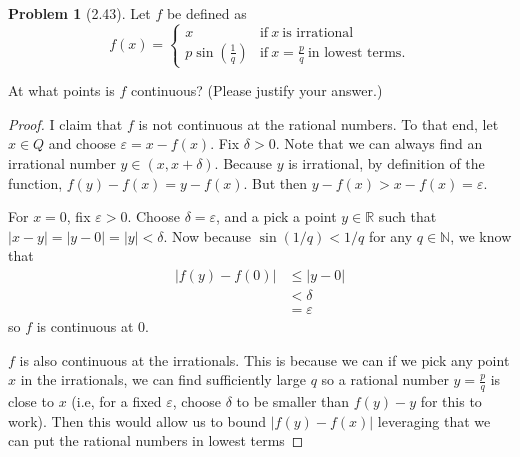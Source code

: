 \documentclass[12pt]{article}
\newcommand{\R}{\mathbb{R}}
\newcommand{\N}{\mathbb{N}}
\renewcommand{\epsilon}{\varepsilon}
\theoremstyle{definition}
\newtheorem{problem}{Problem}
\begin{document}
\begin{problem}[2.43]

    Let \( f \) be defined as 
        \[
            f(x) =  
            \begin{cases}
                x & \text{if} \ x \ \text{is irrational} \\
                p \sin \left( \frac{1}{q} \right) & \text{if} \ x = \frac{p}{q} \ \text{in lowest terms.}    
            \end{cases}  
        \]

            At what points is \( f \) continuous? (Please justify your answer.)

            \begin{proof}

                I claim that \( f \) is not continuous at the rational numbers. To that end, let \( x \in Q \) and choose \( \epsilon = x - f(x) \). Fix \( \delta > 0 \). Note that we can always find an irrational number \( y \in (x, x + \delta) \). Because \( y \) is irrational, by definition of the function, \( f(y) - f(x) = y - f(x) \). But then \( y - f(x) > x - f(x) = \epsilon \).

                For \( x =  0  \), fix \( \epsilon > 0 \). Choose \( \delta = \epsilon  \), and a pick a point \( y \in \R \) such that \( |x - y| = |y - 0| = |y| < \delta \).
                Now because \(\sin(1/q) < 1/q  \) for any \( q \in \N \), we know that 
                    \begin{align*}
                        |f(y)  - f(0)| &\leq |y - 0| \\ 
                                    &< \delta \\
                                    &= \epsilon
                    \end{align*}
                so \( f \) is continuous at \( 0 \).

                \( f \)  is also continuous at the irrationals. This is because we can if we pick any point \( x \) in the irrationals, we can find sufficiently large \( q \) so a rational number \( y = \frac{p}{q} \) is close to \( x \) (i.e, for a fixed \( \epsilon \), choose \( \delta \) to be smaller than \( f(y) - y \) for this to work). Then this would allow us to bound \( |f(y) - f(x)| \) leveraging that we can put the rational numbers in lowest terms    
                
            \end{proof}
    
\end{problem}
\end{document}
